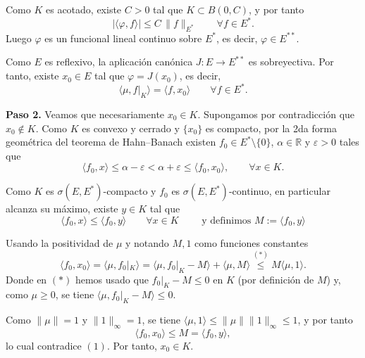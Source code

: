 \documentclass[12pt]{article}
\begin{document}
\begin{ejercicio}[2 puntos]
        Como $K$ es acotado, existe $C>0$ tal que $K\subset B(0,C)$, y por tanto
        \begin{equation*}
        |\langle \varphi,f\rangle|
        \le C\,\|f\|_{E^\ast}
        \qquad \forall f\in E^\ast.
        \end{equation*}
        Luego $\varphi$ es un funcional lineal continuo sobre $E^\ast$, es decir,
        $\varphi\in E^{\ast\ast}$.
        
        Como $E$ es reflexivo, la aplicación canónica $J:E\to E^{\ast\ast}$ es sobreyectiva.
        Por tanto, existe $x_0\in E$ tal que $\varphi=J(x_0)$, es decir,
        \begin{equation*}
        \langle \mu,f|_K\rangle = \langle f,x_0\rangle
        \qquad \forall f\in E^\ast.
        \end{equation*}
        
        \medskip
        
        \textbf{Paso 2.}
        Veamos que necesariamente $x_0\in K$.
        Supongamos por contradicción que $x_0\notin K$. Como $K$ es convexo y cerrado y $\{x_0\}$ es compacto, por la 2da forma geométrica del teorema de Hahn--Banach existen $f_0\in E^\ast\setminus\{0\}$, $\alpha\in\mathbb{R}$ y $\varepsilon>0$ tales que
        \begin{equation}
        \langle f_0,x\rangle \le \alpha-\varepsilon
        < \alpha+\varepsilon \le \langle f_0,x_0\rangle,
        \qquad \forall x\in K.
        \tag{1}
        \end{equation}
        
        Como $K$ es $\sigma(E,E^\ast)$-compacto y $f_0$ es $\sigma(E,E^\ast)$-continuo, en particular alcanza su máximo, existe $y\in K$ tal que
        \begin{equation*}
        \langle f_0,x\rangle \le \langle f_0,y\rangle
        \qquad \forall x\in K \qquad \text{ y definimos } M:=\langle f_0,y\rangle
        \end{equation*}
        
        Usando la positividad de $\mu$ y notando $M, 1$ como funciones constantes
        \begin{equation*}
        \langle f_0,x_0\rangle
        = \langle \mu,f_0|_K\rangle
        = \langle \mu,f_0|_K-M\rangle + \langle \mu,M\rangle
        \overset{(*)}{\le} M\langle \mu,1\rangle.
        \end{equation*}
        Donde en $(\ast)$ hemos usado que $f_0|_K - M \le 0$ en $K$ (por definición de $M$) y, como $\mu\ge 0$, se tiene $\langle \mu, f_0|_K - M\rangle \le 0$.

        Como $\|\mu\|=1$ y $\|1\|_\infty=1$, se tiene $\langle \mu,1\rangle\le \|\mu\|\|1\|_\infty \le 1$, y por tanto
        \begin{equation*}
        \langle f_0,x_0\rangle \le M = \langle f_0,y\rangle,
        \end{equation*}
        lo cual contradice $(1)$. Por tanto, $x_0\in K$.
        
    \end{ejercicio}
\end{document}

